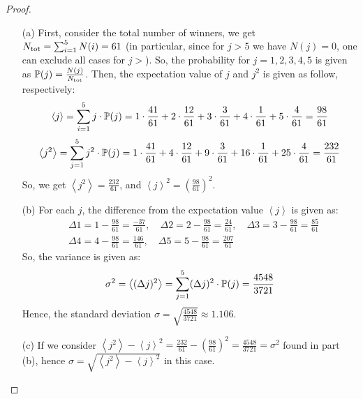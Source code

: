 \documentclass{article}
\begin{document}
\begin{proof}

    \hfil

    \begin{itemize}
        \item[(a)] First, consider the total number of winners, we get $N_\textmd{tot} = \sum_{i=1}^5 N(i) = 61$ (in particular, since for $j>5$ we have $N(j)=0$, one can exclude all cases for $j>$). So, the probability for $j=1,2,3,4,5$ is given as $\mathbb{P}(j) = \frac{N(j)}{N_\textmd{tot}}$. Then, the expectation value of $j$ and $j^2$ is given as follow, respectively:
        \begin{align}
            \left<j\right>=\sum_{i=1}^5 j \cdot \mathbb{P}(j) = 1\cdot \frac{41}{61}+2\cdot \frac{12}{61}+3\cdot\frac{3}{61}+4\cdot\frac{1}{61}+5\cdot \frac{4}{61}=\frac{98}{61}
        \end{align}
        \begin{align}
            \left<j^2\right> = \sum_{j=1}^{5}j^2\cdot\mathbb{P}(j) = 1\cdot\frac{41}{61}+4\cdot\frac{12}{61}+9\cdot\frac{3}{61}+16\cdot\frac{1}{61}+25\cdot\frac{4}{61}=\frac{232}{61}
        \end{align}
        So, we get $\left<j^2\right>=\frac{232}{61}$, and $\left<j\right>^2 = \left(\frac{98}{61}\right)^2$.

        \item[(b)] For each $j$, the difference from the expectation value $\left<j\right>$ is given as:
        \begin{align}
            &\Delta 1 = 1-\frac{98}{61}=\frac{-37}{61},\quad \Delta 2=2-\frac{98}{61}=\frac{24}{61},\quad \Delta 3=3-\frac{98}{61}=\frac{85}{61}\\
            &\Delta 4=4-\frac{98}{61}=\frac{146}{61},\quad \Delta 5=5-\frac{98}{61}=\frac{207}{61}
        \end{align}
        So, the variance is given as:
        \begin{align}
            \sigma^2=\left<(\Delta j)^2\right> = \sum_{j=1}^5(\Delta j)^2\cdot \mathbb{P}(j)=\frac{4548}{3721}
        \end{align}
        Hence, the standard deviation $\sigma=\sqrt{\frac{4548}{3721}}\approx 1.106$.

        \item[(c)] If we consider $\left<j^2\right>-\left<j\right>^2 = \frac{232}{61}-\left(\frac{98}{61}\right)^2 = \frac{4548}{3721}=\sigma^2$ found in part (b), hence $\sigma =\sqrt{\left<j^2\right>-\left<j\right>^2}$ in this case.
    \end{itemize}
\end{proof}
\end{document}
